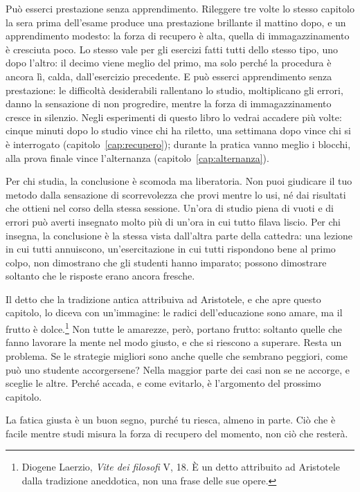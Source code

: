 Può esserci prestazione senza apprendimento. Rileggere tre volte lo
stesso capitolo la sera prima dell'esame produce una prestazione
brillante il mattino dopo, e un apprendimento modesto: la forza di
recupero è alta, quella di immagazzinamento è cresciuta poco. Lo
stesso vale per gli esercizi fatti tutti dello stesso tipo, uno dopo
l'altro: il decimo viene meglio del primo, ma solo perché la procedura
è ancora lì, calda, dall'esercizio precedente. E può esserci
apprendimento senza prestazione: le difficoltà desiderabili rallentano
lo studio, moltiplicano gli errori, danno la sensazione di non
progredire, mentre la forza di immagazzinamento cresce in silenzio.
Negli esperimenti di questo libro lo vedrai accadere più volte: cinque
minuti dopo lo studio vince chi ha riletto, una settimana dopo vince
chi si è interrogato (capitolo~\ref{cap:recupero}); durante la pratica
vanno meglio i blocchi, alla prova finale vince l'alternanza
(capitolo~\ref{cap:alternanza}).

Per chi studia, la conclusione è scomoda ma liberatoria. Non puoi
giudicare il tuo metodo dalla sensazione di scorrevolezza che provi
mentre lo usi, né dai risultati che ottieni nel corso della stessa
sessione. Un'ora di studio piena di vuoti e di errori può averti
insegnato molto più di un'ora in cui tutto filava liscio. Per chi
insegna, la conclusione è la stessa vista dall'altra parte della
cattedra: una lezione in cui tutti annuiscono, un'esercitazione in cui
tutti rispondono bene al primo colpo, non dimostrano che gli studenti
hanno imparato; possono dimostrare soltanto che le risposte erano
ancora fresche.

Il detto che la tradizione antica attribuiva ad Aristotele, e che apre
questo capitolo, lo diceva con un'immagine: le radici dell'educazione
sono amare, ma il frutto è dolce.\footnote{Diogene Laerzio, \emph{Vite
dei filosofi} V, 18. È un detto attribuito ad Aristotele dalla
tradizione aneddotica, non una frase delle sue opere.} Non tutte le
amarezze, però, portano frutto: soltanto quelle che fanno lavorare la
mente nel modo giusto, e che si riescono a superare. Resta un problema.
Se le strategie migliori sono anche quelle che sembrano peggiori, come
può uno studente accorgersene? Nella maggior parte dei casi non se ne
accorge, e sceglie le altre. Perché accada, e come evitarlo, è
l'argomento del prossimo capitolo.

\begin{daricordare}
La fatica giusta è un buon segno, purché tu riesca, almeno in parte. Ciò
che è facile mentre studi misura la forza di recupero del momento, non
ciò che resterà.
\end{daricordare}

